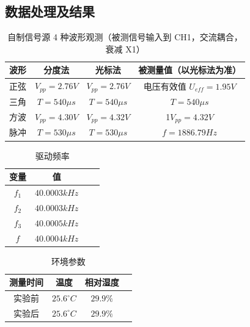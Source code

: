 \documentclass[12pt,a4paper]{amsart}
\begin{document}
\subsection{数据处理及结果}

\begin{table}[htbp]
    \centering
    \caption{自制信号源 4 种波形观测（被测信号输入到 CH1，交流耦合，衰减 X1）}
    \label{tab:score}
    \begin{tabular}{cccc}
    \toprule
    \textbf{波形} & \textbf{分度法} & \textbf{光标法} & \textbf{被测量值（以光标法为准）} \\
    \midrule
    正弦 & $V_{pp} = 2.76V$ & $V_{pp} = 2.76V$ & 电压有效值 $U_{eff} = 1.95V$ \\
    三角 & $T = 540 \mu s$ & $T = 540 \mu s$ & $T = 540 \mu s$ \\
    方波 & $V_{pp} = 4.30V$ & $V_{pp} = 4.32V$ & 1$V_{pp} = 4.32V$ \\
    脉冲 & $T = 530 \mu s$ & $T = 530 \mu s$ & $f = 1886.79 Hz$ \\
    \bottomrule
    \end{tabular}
    \end{table}

    \begin{table}[htbp]
        \centering
        \caption{驱动频率}
        \label{tab:score}
        \begin{tabular}{cccc}
        \toprule
        \textbf{变量} & \textbf{值} \\
        \midrule
        $f_1$ & $40.0003 kHz$ \\
        $f_2$ & $40.0003 kHz$ \\
        $f_3$ & $40.0005 kHz$ \\
        $f$ & $40.0004 kHz$ \\
        \bottomrule
        \end{tabular}
        \end{table}

        \begin{table}[htbp]
            \centering
            \caption{环境参数}
            \label{tab:score}
            \begin{tabular}{cccc}
            \toprule
            \textbf{测量时间} & \textbf{温度} & \textbf{相对湿度} \\
            \midrule
            实验前 & $25.6^{\circ}C$ & $29.9\%$ \\
            实验后 & $25.6^{\circ}C$ & $29.9\%$ \\
            \bottomrule
            \end{tabular}
            \end{table}
\end{document}
